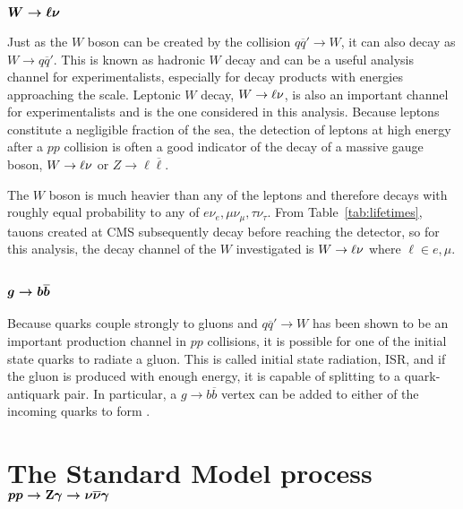  \subsection[\wln]
 {$\boldsymbol{W\rightarrow\ell\nu}$}
  Just as the $W$ boson can be created by the
   collision $q\overline{q}'\rightarrow W$, 
   it can also decay as $W\rightarrow q\overline{q}'$.
  This is known as hadronic $W$ decay and
   can be a useful analysis channel for experimentalists,
   especially for decay products with energies approaching
   the \TeV scale.
  Leptonic $W$ decay, $W\rightarrow\ell\nu$, is also an important 
   channel for experimentalists and is the
   one considered in this analysis.
  Because leptons constitute a negligible fraction
   of the sea, the detection of leptons at high
   energy after a $pp$ collision is often a good 
   indicator of the decay of a massive gauge boson,
   $W\rightarrow\ell\nu$ or $Z\rightarrow \ell\overline{\ell}$.
  
  The $W$ boson is much heavier than any of the leptons
   and therefore decays with roughly equal probability
   to any of $e\nu_e, \mu\nu_\mu, \tau\nu_\tau$.
  From Table~\ref{tab:lifetimes}, tauons created
   at CMS
   subsequently decay before reaching the 
   detector, so for this analysis, the decay
   channel of the $W$ investigated is
   $W\rightarrow\ell\nu$ where $\ell\in e,\mu$.

 \subsection[\gbb]
 {$\boldsymbol{g\rightarrow b\overline{b}}$}
  Because quarks couple strongly to gluons
   and $q\overline{q}'\rightarrow W$ has been shown to be
   an important production channel in $pp$ collisions,
   it is possible for one of the
   initial state quarks to radiate a gluon.
  This is called initial state radiation, ISR,
   and if the gluon is produced with enough energy,
   it is capable of splitting to a quark-antiquark pair.
  In particular, a $g\rightarrow b\overline{b}$ vertex
   can be added to either of the incoming quarks to 
   form \ppwbblnbb.
  
  
%
%

\section[The Standard Model process \ppzgnng]
        {The Standard Model process $\boldsymbol{pp\rightarrow \mathrm{Z}\gamma\rightarrow\nu\overline{\nu}\gamma}$} \label{sec:znngproduction}


